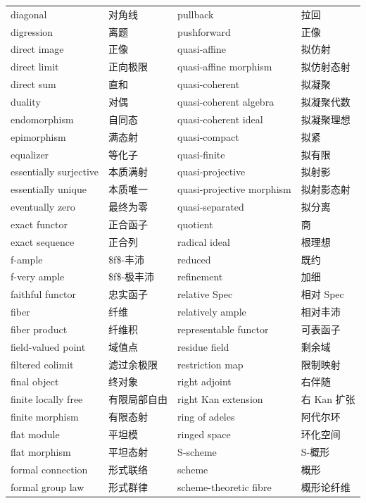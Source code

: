 \begin{longtable}{@{}>{\raggedright\arraybackslash}p{}>{\raggedright\arraybackslash}p{}>{\raggedright\arraybackslash}p{}>{\raggedright\arraybackslash}p{}@{}}
diagonal & 对角线 & pullback & 拉回 \\
digression & 离题 & pushforward & 正像 \\
direct image & 正像 & quasi-affine & 拟仿射 \\
direct limit & 正向极限 & quasi-affine morphism & 拟仿射态射 \\
direct sum & 直和 & quasi-coherent & 拟凝聚 \\
duality & 对偶 & quasi-coherent algebra & 拟凝聚代数 \\
endomorphism & 自同态 & quasi-coherent ideal & 拟凝聚理想 \\
epimorphism & 满态射 & quasi-compact & 拟紧 \\
equalizer & 等化子 & quasi-finite & 拟有限 \\
essentially surjective & 本质满射 & quasi-projective & 拟射影 \\
essentially unique & 本质唯一 & quasi-projective morphism & 拟射影态射 \\
eventually zero & 最终为零 & quasi-separated & 拟分离 \\
exact functor & 正合函子 & quotient & 商 \\
exact sequence & 正合列 & radical ideal & 根理想 \\
f-ample & \$f\$-丰沛 & reduced & 既约 \\
f-very ample & \$f\$-极丰沛 & refinement & 加细 \\
faithful functor & 忠实函子 & relative Spec & 相对 Spec \\
fiber & 纤维 & relatively ample & 相对丰沛 \\
fiber product & 纤维积 & representable functor & 可表函子 \\
field-valued point & 域值点 & residue field & 剩余域 \\
filtered colimit & 滤过余极限 & restriction map & 限制映射 \\
final object & 终对象 & right adjoint & 右伴随 \\
finite locally free & 有限局部自由 & right Kan extension & 右 Kan 扩张 \\
finite morphism & 有限态射 & ring of adeles & 阿代尔环 \\
flat module & 平坦模 & ringed space & 环化空间 \\
flat morphism & 平坦态射 & S-scheme & S-概形 \\
formal connection & 形式联络 & scheme & 概形 \\
formal group law & 形式群律 & scheme-theoretic fibre & 概形论纤维 \\

\end{longtable}
